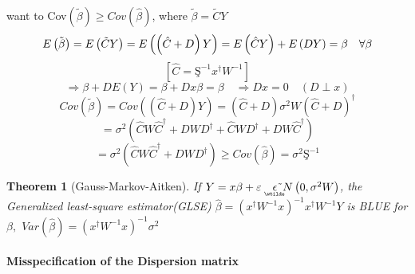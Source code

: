 \documentclass{article}
\newtheorem{theorem}{Theorem}
\begin{document}
want to Cov$\left( \tilde{\beta}\right) \geq Cov\left( \hat{\beta}\right) $,
where $\tilde{\beta}=\tilde{C}Y$%
\begin{equation*}
E\left( \tilde{\beta}\right) =E\left( \tilde{C}Y\right) =E\left( \left( \hat{%
C}+D\right) Y\right) =E\left( \hat{C}Y\right) +E\left( DY\right) =\beta
\quad \forall \beta
\end{equation*}%
\begin{equation*}
\left[ \hat{C}=\text{\c{S}}^{-1}x^{\dagger }W^{-1}\right]
\end{equation*}%
\begin{equation*}
\Rightarrow \beta +DE\left( Y\right) =\beta +Dx\beta =\beta \quad
\Rightarrow Dx=0\quad \left( D\perp x\right)
\end{equation*}%
\begin{equation*}
Cov\left( \tilde{\beta}\right) =Cov\left( \left( \hat{C}+D\right) Y\right)
=\left( \hat{C}+D\right) \sigma ^{2}W\left( \hat{C}+D\right) ^{\dagger }
\end{equation*}%
\begin{equation*}
=\sigma ^{2}\left( \hat{C}W\hat{C}^{\dagger }+DWD^{\dagger }+\hat{C}%
WD^{\dagger }+DW\hat{C}^{\dagger }\right)
\end{equation*}%
\begin{equation*}
=\sigma ^{2}\left( \hat{C}W\hat{C}^{\dagger }+DWD^{\dagger }\right) \geq
Cov\left( \hat{\beta}\right) =\sigma ^{2}\text{\c{S}}^{-1}
\end{equation*}

\bigskip

\begin{theorem}[Gauss-Markov-Aitken]
If $Y=x\beta +\varepsilon \quad 
\underaccent{\wtilde}{\epsilon}%
\symbol{126}N\left( 0,\sigma ^{2}W\right) $, the Generalized least-square
estimator(GLSE) $\hat{\beta}=\left( x^{\dagger }W^{-1}x\right)
^{-1}x^{\dagger }W^{-1}Y$ is BLUE for $\beta ,$ $Var\left( \hat{\beta}%
\right) =\left( x^{\dagger }W^{-1}x\right) ^{-1}\sigma ^{2}$
\end{theorem}

\bigskip

\paragraph{Misspecification of the Dispersion matrix}

\quad

\bigskip
\end{document}
